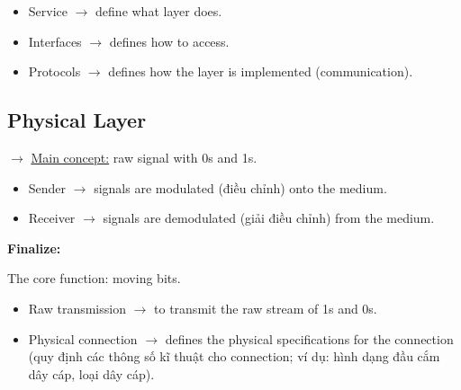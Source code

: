 \begin{itemize}
    \item Service $\rightarrow$ define what layer does.
    \item Interfaces $\rightarrow$ defines how to access.
    \item Protocols $\rightarrow$ defines how the layer is implemented (communication).
\end{itemize}
\medskip


\subsection{Physical Layer}

\noindent
$\rightarrow$ \underline{Main concept:} raw signal with 0s and 1s.

\begin{itemize}
    \item Sender $\rightarrow$ signals are modulated (điều chỉnh) onto the medium.
    \item Receiver $\rightarrow$ signals are demodulated (giải điều chỉnh) from the medium.
\end{itemize}
\medskip

\begin{center}
\end{center}
\medskip

\noindent
\textbf{Finalize:}
\medskip

\noindent
The core function: moving bits.

\begin{itemize}
    \item Raw transmission $\rightarrow$ to transmit the raw stream of 1s and 0s.
    \item Physical connection $\rightarrow$ defines the physical specifications for the connection (quy định các thông số kĩ thuật cho connection; ví dụ: hình dạng đầu cắm dây cáp, loại dây cáp).
\end{itemize}

